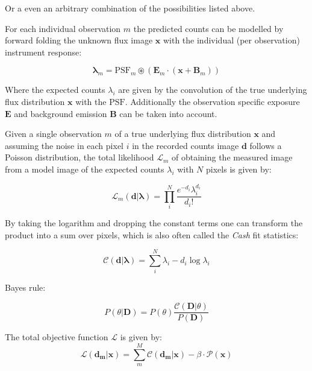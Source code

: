 \documentclass[twocolumn]{aastex631}
\begin{document}
    Or a even an arbitrary combination of the possibilities listed above.

    For each individual observation $m$ the predicted counts can be modelled by forward
    folding the unknown flux image $\mathbf{x}$ with the individual (per observation) instrument response:

    \begin{equation}
        \label{eq:model}
        \mathbf{\lambda}_m = \mathrm{PSF}_m \circledast \left(\mathbf{E}_m \cdot (\mathbf{x} + \mathbf{B}_m) \right)
    \end{equation}

    Where the expected counts $\lambda_i$ are given by the convolution of the true underlying
    flux distribution $\mathbf{x}$ with the $\mathrm{PSF}$. Additionally
    the observation specific exposure $\mathbf{E}$ and background emission $\mathbf{B}$ can be
    taken into account.

    Given a single observation $m$ of a true underlying flux distribution
    $\mathbf{x}$ and assuming the noise in each pixel $i$ in the recorded counts image
    $\mathbf{d}$ follows a Poisson distribution, the total likelihood $\mathcal{L}_m$
    of obtaining the measured image from a model image of the expected
    counts $\lambda_i$ with $N$ pixels is given by:

    \begin{equation}
        \label{eq:poisson}
        \mathcal{L}_m\left( \mathbf{d} | \mathbf{\lambda} \right) = \prod_i^N \frac{{e^{ - d_i } \lambda_i ^ {d_i}}}{{d_i!}}
    \end{equation}


    By taking the logarithm and dropping the constant terms one can transform the
    product into a sum over pixels, which is also often called the \textit{Cash}
    \citep{Cash1979} fit statistics:

    \begin{equation}
        \label{eq:cash}
        \mathcal{C}\left( \mathbf{d} | \mathbf{\lambda} \right) = \sum_i^N \lambda_i - d_i \log{\lambda_i}
    \end{equation}


    Bayes rule:

    \begin{equation}
        \label{eq:bayes}
        P(\theta|\textbf{D}) = P(\theta ) \frac{\mathcal{C}(\textbf{D} |\theta)}{P(\textbf{D})}
    \end{equation}

    The total objective function $\mathcal{L}$ is given by:
    \begin{equation}
        \label{eq:total}
        \mathcal{L}\left( \mathbf{d_m} | \mathbf{x} \right) = \sum_m^M \mathcal{C}\left( \mathbf{d_m} | \mathbf{x} \right) - \beta \cdot \mathcal{P}(\mathbf{x})
    \end{equation}
\end{document}
